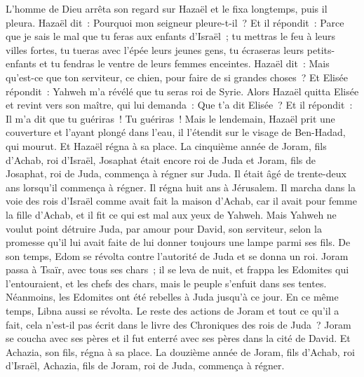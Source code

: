 \begin{multicols}{2}
L'homme de Dieu arrêta son regard sur Hazaël et le fixa longtemps, puis il pleura.
Hazaël dit~: Pourquoi mon seigneur pleure-t-il~? Et il répondit~: Parce que je sais le mal que tu feras aux enfants d'Israël~; tu mettras le feu à leurs villes fortes, tu tueras avec l'épée leurs jeunes gens, tu écraseras leurs petits-enfants et tu fendras le ventre de leurs femmes enceintes.
Hazaël dit~: Mais qu'est-ce que ton serviteur, ce chien, pour faire de si grandes choses~? Et Elisée répondit~: Yahweh m'a révélé que tu seras roi de Syrie.
Alors Hazaël quitta Elisée et revint vers son maître, qui lui demanda~: Que t'a dit Elisée~? Et il répondit~: Il m'a dit que tu guériras~! Tu guériras~!
Mais le lendemain, Hazaël prit une couverture et l'ayant plongé dans l'eau, il l'étendit sur le visage de Ben-Hadad, qui mourut. Et Hazaël régna à sa place.
La cinquième année de Joram, fils d'Achab, roi d'Israël, Josaphat était encore roi de Juda et Joram, fils de Josaphat, roi de Juda, commença à régner sur Juda.
Il était âgé de trente-deux ans lorsqu'il commença à régner. Il régna huit ans à Jérusalem.
Il marcha dans la voie des rois d'Israël comme avait fait la maison d'Achab, car il avait pour femme la fille d'Achab, et il fit ce qui est mal aux yeux de Yahweh.
Mais Yahweh ne voulut point détruire Juda, par amour pour David, son serviteur, selon la promesse qu'il lui avait faite de lui donner toujours une lampe parmi ses fils.
De son temps, Edom se révolta contre l'autorité de Juda et se donna un roi.
Joram passa à Tsaïr, avec tous ses chars~; il se leva de nuit, et frappa les Edomites qui l'entouraient, et les chefs des chars, mais le peuple s'enfuit dans ses tentes.
Néanmoins, les Edomites ont été rebelles à Juda jusqu'à ce jour. En ce même temps, Libna aussi se révolta.
Le reste des actions de Joram et tout ce qu'il a fait, cela n'est-il pas écrit dans le livre des Chroniques des rois de Juda~?
Joram se coucha avec ses pères et il fut enterré avec ses pères dans la cité de David. Et Achazia, son fils, régna à sa place.
La douzième année de Joram, fils d'Achab, roi d'Israël, Achazia, fils de Joram, roi de Juda, commença à régner.

\end{multicols}
